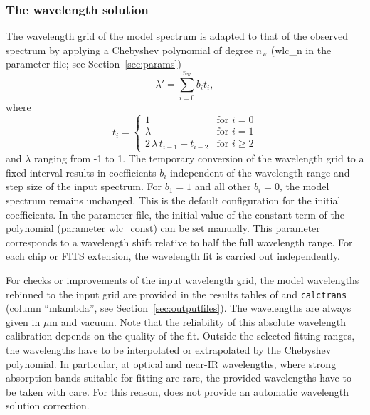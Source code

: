 \subsubsection{The wavelength solution}\label{sec:wavegrid}
The wavelength grid of the model spectrum is adapted to that of the observed
spectrum by applying a Chebyshev polynomial of degree $n_\mathrm{w}$
({\sc wlc\_n} in the parameter file; see Section~\ref{sec:params})
\begin{equation}
\lambda' = \sum_{i = 0}^{n_\mathrm{w}} b_i t_i,
\end{equation}
where
\begin{equation}
t_i = \left\{ \begin{array}{ll}
1 & \textrm{for\ } i = 0 \\
\lambda & \textrm{for\ } i = 1 \\
2 \, \lambda \, t_{i-1} - t_{i-2} & \textrm{for\ } i \ge 2
\end{array} \right.
\end{equation}
and $\lambda$ ranging from -1 to 1. The temporary conversion of the wavelength
grid to a fixed interval results in coefficients $b_i$ independent of the
wavelength range and step size of the input spectrum. For $b_1 = 1$ and all
other $b_i = 0$, the model spectrum remains unchanged. This is the default
configuration for the initial coefficients. In the parameter file,
the initial value of the constant term of the polynomial (parameter
{\sc wlc\_const}) can be set manually. This parameter corresponds to a
wavelength shift relative to half the full wavelength range. For each chip or
FITS extension, the wavelength fit is carried out independently.

For checks or improvements of the input wavelength grid, the model wavelengths
rebinned to the input grid are provided in the results tables of \mf{} and
{\tt calctrans} (column ``mlambda'', see Section~\ref{sec:outputfiles}). The
wavelengths are always given in $\mu$m and vacuum. Note that the reliability of
this absolute wavelength calibration depends on the quality of the fit. Outside
the selected fitting ranges, the wavelengths have to be interpolated or
extrapolated by the Chebyshev polynomial. In particular, at optical and near-IR
wavelengths, where strong absorption bands suitable for fitting are rare, the
provided wavelengths have to be taken with care. For this reason, \mf{} does
not provide an automatic wavelength solution correction.

